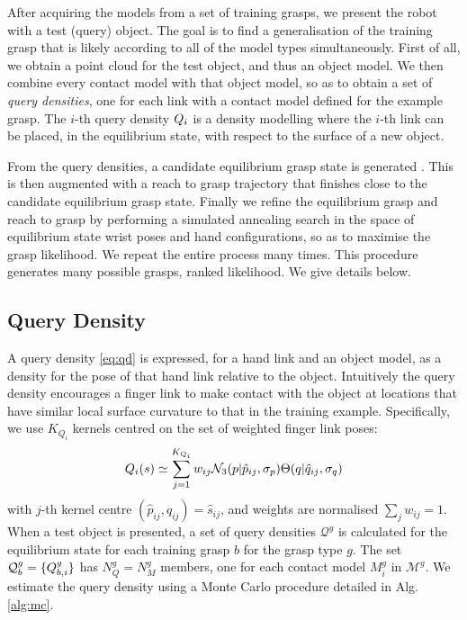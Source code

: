 
After acquiring the models from a set of training grasps, we present the robot with a test (query) object. The goal is to find a generalisation of the training grasp that is likely according to all of the model types simultaneously. First of all, we obtain a point cloud for the test object, and thus an object model. We then combine every contact model with that object model, so as to obtain a set of {\em query densities}, one for each link with a contact model defined for the example grasp. The $i$-th query density $Q_i$ is a density modelling where the $i$-th link can be placed, in the equilibrium state, with respect to the surface of a new object. 

From the query densities, a candidate equilibrium grasp state is generated . This is then augmented with a reach to grasp trajectory that finishes close to the candidate equilibrium grasp state. Finally we refine the equilibrium grasp and reach to grasp by performing a simulated annealing search in the space of equilibrium state wrist poses and hand configurations, so as to maximise the grasp likelihood. We repeat the entire process many times. This procedure generates many possible grasps, ranked likelihood. We give details below.

\subsection{Query Density}

A query density \eqref{eq:qd} is expressed, for a hand link and an object model, as a density for the pose of that hand link relative to the object. Intuitively the query density encourages a finger link to make contact with the object at locations that have similar local surface curvature to that in the training example. Specifically, we use $K_{Q_i}$ kernels centred on the set of weighted finger link poses:
\begin{equation}
\qd_i(s) \simeq \sum^{K_{Q_i}}_{j=1} w_{ij} \mathcal{N}_3(p|{\hat{p}_{ij}}, \sigma_{p}) \Theta(q|{\hat{q}_{ij}}, \sigma_{q})%
\label{eq:qd.approx}
\end{equation}
with $j$-th kernel centre $({\hat{p}_{ij}}, {\hat{q}_{ij}}) = \hat{s}_{ij}$, and weights are normalised $\sum_j w_{ij} = 1$. When a test object is presented, a set of query densities $\mathcal{Q}^g$ is calculated for the equilibrium state for each training grasp $b$ for the grasp type $g$. The set $\mathcal{Q}^g_b =\{Q_{b,i}^g\}$ has $N^g_Q=N^g_M$ members, one for each contact model $M_i^g$ in $\mathcal{M}^g$. We estimate the query density using a Monte Carlo procedure detailed in Alg.\ref{alg:mc}.

